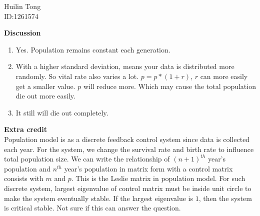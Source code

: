 \documentclass{article}
\begin{document}
\begin{center} Huilin Tong\\
ID:1261574
\end{center}

{\bf Discussion}\\
\begin{enumerate}
	\item Yes. Population remains constant each generation.
	\item With a higher standard deviation, means your data is distributed more randomly. So vital rate also varies a lot. $p=p*(1+r)$, $r$ can more easily get a smaller value. $p$ will reduce more. Which may cause the total population die out more easily.
	\item It still will die out completely.
\end{enumerate}

{\bf Extra credit}\\

Population model is as a discrete feedback control system since data is collected each year. For the system, we change the survival rate and birth rate to influence total population size. We can write the relationship of $(n+1)^{th}$ year's population and $n^{th}$ year's population in matrix form with a control matrix consists with $m$ and $p$. This is the Leslie matrix in population model. For such discrete system, largest eigenvalue of control matrix must be inside unit circle to make the system eventually stable. If the largest eigenvalue is $1$, then the system is critical stable. Not sure if this can answer the question.
\end{document}
